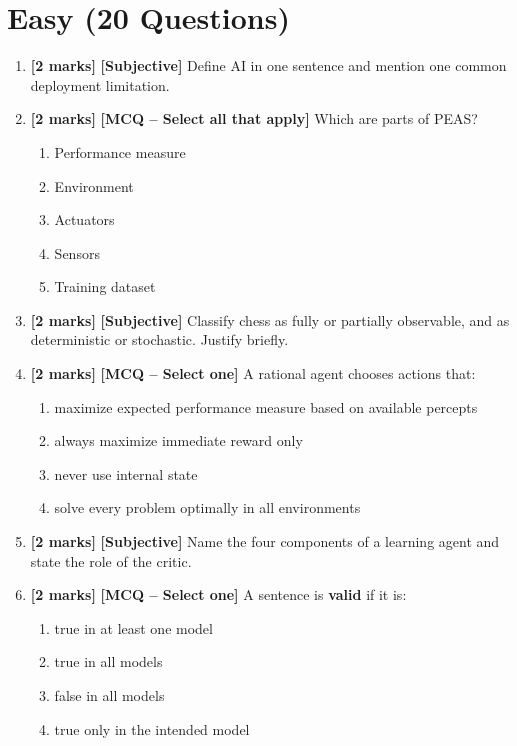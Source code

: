 \documentclass[11pt,a4paper]{article}
\newcommand{\EMarks}{\textbf{[2 marks]} }
\begin{document}
\section*{Easy (20 Questions)}
\begin{enumerate}[label=\textbf{E\arabic*.}, leftmargin=*]
  \item \EMarks \textbf{[Subjective]} Define AI in one sentence and mention one common deployment limitation.

  \item \EMarks \textbf{[MCQ -- Select all that apply]} Which are parts of PEAS?
    \begin{enumerate}[label=(\Alph*), leftmargin=*]
      \item Performance measure
      \item Environment
      \item Actuators
      \item Sensors
      \item Training dataset
    \end{enumerate}

  \item \EMarks \textbf{[Subjective]} Classify chess as fully or partially observable,
    and as deterministic or stochastic. Justify briefly.

  \item \EMarks \textbf{[MCQ -- Select one]} A rational agent chooses actions that:
    \begin{enumerate}[label=(\Alph*), leftmargin=*]
      \item maximize expected performance measure based on available percepts
      \item always maximize immediate reward only
      \item never use internal state
      \item solve every problem optimally in all environments
    \end{enumerate}

  \item \EMarks \textbf{[Subjective]} Name the four components of a learning agent and state the role of the critic.

  \item \EMarks \textbf{[MCQ -- Select one]} A sentence is \textbf{valid} if it is:
    \begin{enumerate}[label=(\Alph*), leftmargin=*]
      \item true in at least one model
      \item true in all models
      \item false in all models
      \item true only in the intended model
    \end{enumerate}


\end{enumerate}
\end{document}
